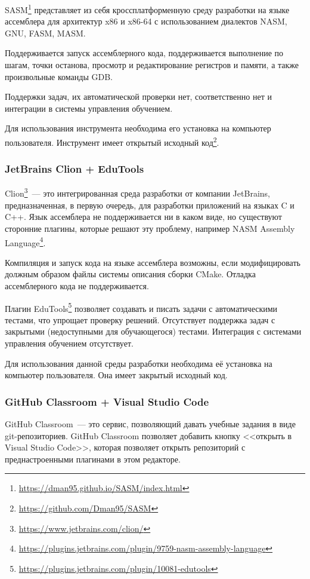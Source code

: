 \documentclass[a4paper,article,14pt]{extarticle}
\begin{document}
SASM\footnote{\url{https://dman95.github.io/SASM/index.html}} представляет из себя кроссплатформенную среду разработки на языке ассемблера для архитектур x86 и x86-64 с использованием диалектов NASM, GNU, FASM, MASM.

Поддерживается запуск ассемблерного кода, поддерживается выполнение по шагам, точки останова, просмотр и редактирование регистров и памяти, а также произвольные команды GDB.

Поддержки задач, их автоматической проверки нет, соответственно нет и интеграции в системы управления обучением.

Для использования инструмента необходима его установка на компьютер пользователя. Инструмент имеет открытый исходный код\footnote{\url{https://github.com/Dman95/SASM}}.

\subsubsection{JetBrains Clion + EduTools}

Clion\footnote{\url{https://www.jetbrains.com/clion/}}~--- это интегрированная среда разработки от компании JetBrains, предназначенная, в первую очередь, для разработки приложений на языках C и C++. Язык ассемблера не поддерживается ни в каком виде, но существуют сторонние плагины, которые решают эту проблему, например NASM Assembly Language\footnote{\url{https://plugins.jetbrains.com/plugin/9759-nasm-assembly-language}}.

Компиляция и запуск кода на языке ассемблера возможны, если модифицировать должным образом файлы системы описания сборки CMake. Отладка ассемблерного кода не поддерживается.

Плагин EduTools\footnote{\url{https://plugins.jetbrains.com/plugin/10081-edutools}} позволяет создавать и писать задачи с автоматическими тестами, что упрощает проверку решений. Отсутствует поддержка задач с закрытыми (недоступными для обучающегося) тестами. Интеграция с системами управления обучением отсутствует.

Для использования данной среды разработки необходима её установка на компьютер пользователя. Она имеет закрытый исходный код.

\subsubsection{GitHub Classroom + Visual Studio Code}

GitHub Classroom~--- это сервис, позволяющий давать учебные задания в виде git-репозиториев. GitHub Classroom позволяет добавить кнопку <<открыть в Visual Studio Code>>, которая позволяет открыть репозиторий с преднастроенными плагинами в этом редакторе.
\end{document}
